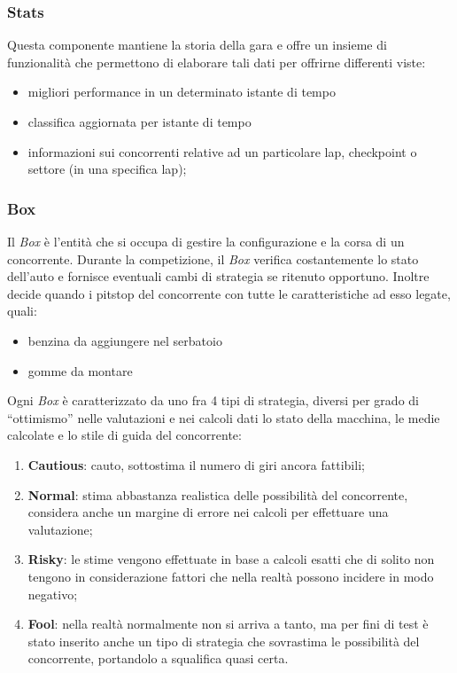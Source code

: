 \subsubsection{Stats}
Questa componente mantiene la storia della gara e offre un insieme di funzionalit\`{a} che permettono di elaborare tali dati per offrirne differenti viste:
	\begin{itemize}
		\item migliori performance in un determinato istante di tempo
		\item classifica aggiornata per istante di tempo
		\item informazioni sui concorrenti relative ad un particolare lap, checkpoint o settore (in una specifica lap);
	\end{itemize}
\subsubsection{Box}
\label{box}
Il \emph{Box} \`{e} l'entit\`{a} che si occupa di gestire la configurazione e la corsa di un concorrente. Durante la competizione, il \emph{Box} verifica costantemente
lo stato dell'auto e fornisce eventuali cambi di strategia se ritenuto opportuno. Inoltre decide quando i pitstop del concorrente con tutte le caratteristiche 
ad esso legate, quali:
	\begin{itemize}
		\item benzina da aggiungere nel serbatoio
		\item gomme da montare
	\end{itemize}
Ogni \emph{Box} \`{e} caratterizzato da uno fra 4 tipi di strategia, diversi per grado di ``ottimismo'' nelle valutazioni e nei calcoli dati lo stato della 
macchina, le medie calcolate e lo stile di guida del concorrente:
	\begin{enumerate}
		\item \textbf{Cautious}: cauto, sottostima il numero di giri ancora fattibili;
		\item \textbf{Normal}: stima abbastanza realistica delle possibilit\`{a} del concorrente, considera anche un margine di errore nei calcoli
			per effettuare una valutazione;
		\item \textbf{Risky}: le stime vengono effettuate in base a calcoli esatti che di solito non tengono in considerazione fattori che nella
			realt\`{a} possono incidere in modo negativo;
		\item \textbf{Fool}: nella realt\`{a} normalmente non si arriva a tanto, ma per fini di test \`{e} stato inserito anche un tipo di strategia
			che sovrastima le possibilit\`{a} del concorrente, portandolo a squalifica quasi certa.
	\end{enumerate}
